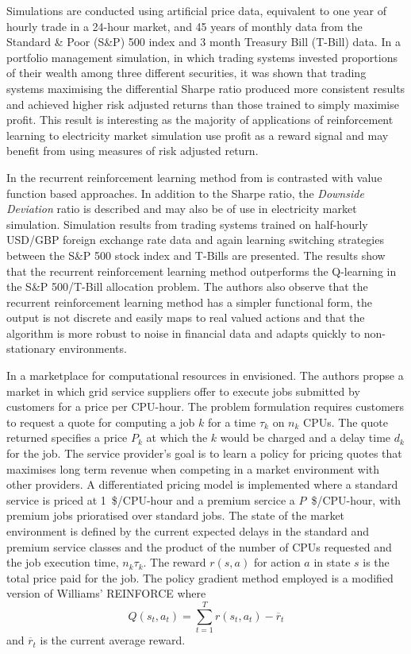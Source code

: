 Simulations are conducted using artificial price data, equivalent to one year
of hourly trade in a 24-hour market, and 45 years of monthly data from the
Standard \& Poor (S\&P) 500 index and 3 month Treasury Bill (T-Bill) data. In a
portfolio management simulation, in which trading systems invested proportions
of their wealth among three different securities, it was shown that trading
systems maximising the differential Sharpe ratio produced more consistent
results and achieved higher risk adjusted returns than those trained to simply
maximise profit.  This result is interesting as the majority of applications of
reinforcement learning to electricity market simulation use profit as a reward
signal and may benefit from using measures of risk adjusted return.

In \cite{moody:direct} the recurrent reinforcement learning method from
\cite{moody:98} is contrasted with value function based approaches.  In
addition to the Sharpe ratio, the \textit{Downside Deviation} ratio is
described and may also be of use in electricity market simulation.  Simulation
results from trading systems trained on half-hourly USD/GBP foreign exchange
rate data and again learning switching strategies between the S\&P 500 stock
index and T-Bills are presented.  The results show that the recurrent
reinforcement learning method outperforms the Q-learning in the S\&P 500/T-Bill
allocation problem.  The authors also observe that the recurrent reinforcement
learning method has a simpler functional form, the output is not discrete and
easily maps to real valued actions and that the algorithm is more robust to
noise in financial data and adapts quickly to non-stationary environments.

In \cite{vengerov:grid} a marketplace for computational resources in
envisioned.  The authors propse a market in which grid service suppliers offer
to execute jobs submitted by customers for a price per CPU-hour.  The problem
formulation requires customers to request a quote for computing a job $k$ for a
time $\tau_k$ on $n_k$ CPUs.  The quote returned specifies a price $P_k$ at
which the $k$ would be charged and a delay time $d_k$ for the job.  The service
provider's goal is to learn a policy for pricing quotes that maximises long
term revenue when competing in a market environment with other providers.  A
differentiated pricing model is implemented where a standard service is priced
at 1~\$/CPU-hour and a premium sercice a $P$~\$/CPU-hour, with premium jobs
prioratised over standard jobs.  The state of the market environment is defined
by the current expected delays in the standard and premium service classes and
the product of the number of CPUs requested and the job execution time,
$n_k \tau_k$.  The reward $r(s,a)$ for action $a$ in state $s$ is the total
price paid for the job.  The policy gradient method employed is a modified
version of Williams' REINFORCE where
\begin{equation}
Q(s_t,a_t) = \sum_{t=1}^T r(s_t,a_t) - \overline{r}_t
\end{equation}
and $\overline{r}_t$ is the current average reward.

